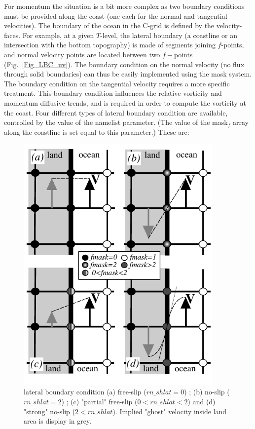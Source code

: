 For momentum the situation is a bit more complex as two boundary conditions 
must be provided along the coast (one each for the normal and tangential velocities). 
The boundary of the ocean in the C-grid is defined by the velocity-faces. 
For example, at a given $T$-level, the lateral boundary (a coastline or an intersection 
with the bottom topography) is made of segments joining $f$-points, and normal 
velocity points are located between two $f-$points (Fig.~\ref{Fig_LBC_uv}). 
The boundary condition on the normal velocity (no flux through solid boundaries) 
can thus be easily implemented using the mask system. The boundary condition 
on the tangential velocity requires a more specific treatment. This boundary 
condition influences the relative vorticity and momentum diffusive trends, and is 
required in order to compute the vorticity at the coast. Four different types of 
lateral boundary condition are available, controlled by the value of the  
namelist parameter. (The value of the mask$_{f}$ array along the coastline is set 
equal to this parameter.) These are:

\begin{figure}[!p] \begin{center}
\includegraphics[width=0.90\textwidth]{./TexFiles/Figures/Fig_LBC_shlat.pdf}
\caption{     \label{Fig_LBC_shlat} 
lateral boundary condition (a) free-slip ($rn\_shlat=0$) ; (b) no-slip ($rn\_shlat=2$) 
; (c) "partial" free-slip ($0<rn\_shlat<2$) and (d) "strong" no-slip ($2<rn\_shlat$). 
Implied "ghost" velocity inside land area is display in grey. }
\end{center}    \end{figure}

